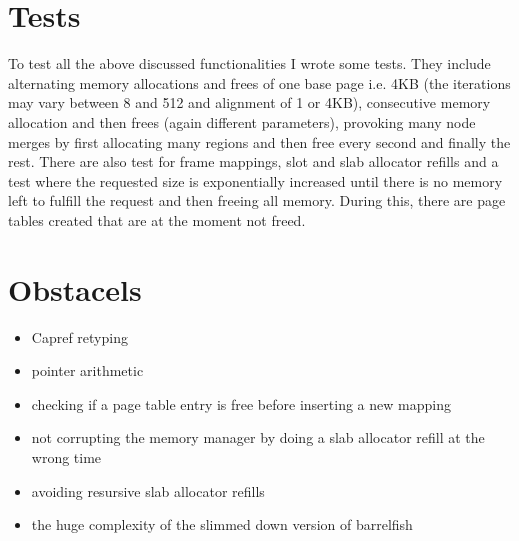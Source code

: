 \section{Tests}

To test all the above discussed functionalities I wrote some tests. They include
alternating memory allocations and frees of one base page i.e. 4KB (the
iterations may vary between 8 and 512 and alignment of 1 or 4KB), consecutive
memory allocation and then frees (again different parameters), provoking many
node merges by first allocating many regions and then free every second and
finally the rest. There are also test for frame mappings, slot and slab
allocator refills and a test where the requested size is exponentially increased
until there is no memory left to fulfill the request and then freeing all
memory.  During this, there are page tables created that are at the moment not
freed.

\section{Obstacels}

\begin{itemize}
\item Capref retyping
\item pointer arithmetic
\item checking if a page table entry is free before inserting a new mapping
\item not corrupting the memory manager by doing a slab allocator refill at the wrong time
\item avoiding resursive slab allocator refills
\item the huge complexity of the slimmed down version of barrelfish
\end{itemize}